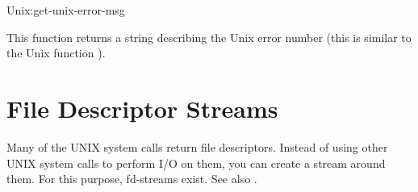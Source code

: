 \begin{defun}{Unix:}{get-unix-error-msg}{}

  This function returns a string describing the Unix error number
   (this is similar to the Unix function ). 
\end{defun}


\section{File Descriptor Streams}
\label{sec:fds}

Many of the UNIX system calls return file descriptors.  Instead of using other
UNIX system calls to perform I/O on them, you can create a stream around them.
For this purpose, fd-streams exist.  See also .

